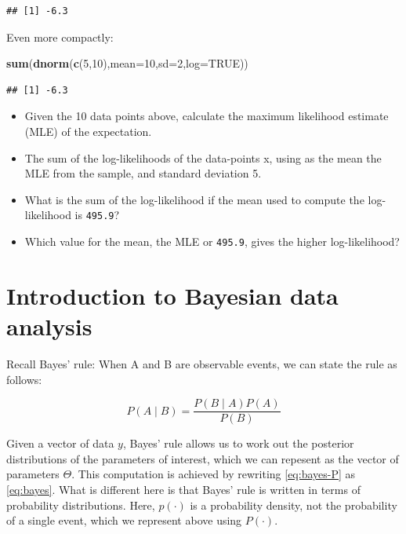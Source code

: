 \documentclass[12pt,]{krantz}
\newenvironment{Shaded}{\begin{snugshade}}{\end{snugshade}}
\newcommand{\DataTypeTok}[1]{\textcolor[rgb]{0.13,0.29,0.53}{#1}}
\newcommand{\DecValTok}[1]{\textcolor[rgb]{0.00,0.00,0.81}{#1}}
\newcommand{\KeywordTok}[1]{\textcolor[rgb]{0.13,0.29,0.53}{\textbf{#1}}}
\newcommand{\NormalTok}[1]{#1}
\newcommand{\OtherTok}[1]{\textcolor[rgb]{0.56,0.35,0.01}{#1}}
\providecommand{\tightlist}{%
  \setlength{\itemsep}{0pt}\setlength{\parskip}{0pt}}
\theoremstyle{definition}
\theoremstyle{definition}
\theoremstyle{definition}
\theoremstyle{remark}
\begin{document}
\begin{verbatim}
## [1] -6.3
\end{verbatim}

Even more compactly:

\begin{Shaded}
\begin{Highlighting}[]
\KeywordTok{sum}\NormalTok{(}\KeywordTok{dnorm}\NormalTok{(}\KeywordTok{c}\NormalTok{(}\DecValTok{5}\NormalTok{,}\DecValTok{10}\NormalTok{),}\DataTypeTok{mean=}\DecValTok{10}\NormalTok{,}\DataTypeTok{sd=}\DecValTok{2}\NormalTok{,}\DataTypeTok{log=}\OtherTok{TRUE}\NormalTok{))}
\end{Highlighting}
\end{Shaded}

\begin{verbatim}
## [1] -6.3
\end{verbatim}

\begin{itemize}
\tightlist
\item
  Given the 10 data points above, calculate the maximum likelihood estimate (MLE) of the expectation.
\item
  The sum of the log-likelihoods of the data-points x, using as the mean the MLE from the sample, and standard deviation 5.
\item
  What is the sum of the log-likelihood if the mean used to compute the log-likelihood is \texttt{495.9}?
\item
  Which value for the mean, the MLE or \texttt{495.9}, gives the higher log-likelihood?
\end{itemize}

\hypertarget{introBDA}{%
\chapter{Introduction to Bayesian data analysis}\label{introBDA}}

Recall Bayes' rule: When A and B are observable events,
we can state the rule as follows:

\begin{equation}
P(A\mid B) = \frac{P(B\mid A) P(A)}{P(B)}
\label{eq:bayes-P}
\end{equation}

Given a vector of data \(y\), Bayes' rule allows us to work out the posterior distributions of the parameters of interest, which we can repesent as the vector of parameters \(\Theta\). This computation is achieved by rewriting \eqref{eq:bayes-P} as \eqref{eq:bayes}. What is different here is that Bayes' rule is written in terms of probability distributions. Here, \(p(\cdot)\) is a probability density, not the probability of a single event, which we represent above using \(P(\cdot)\).
\end{document}
